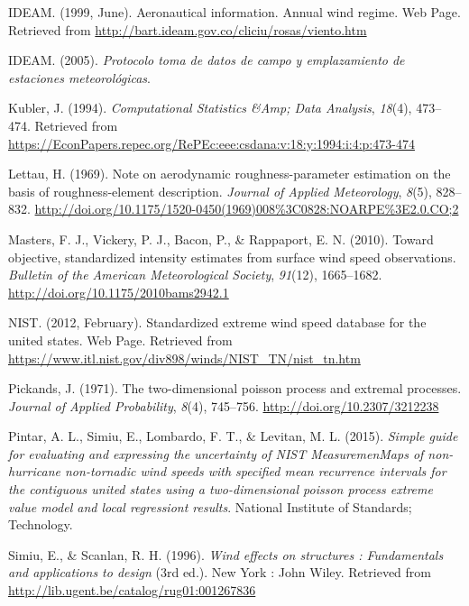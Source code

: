 \documentclass[12pt,oneside]{reedthesis}
\begin{document}
\leavevmode\hypertarget{ref-ideam1999}{}%
IDEAM. (1999, June). Aeronautical information. Annual wind regime. Web Page. Retrieved from \url{http://bart.ideam.gov.co/cliciu/rosas/viento.htm}

\leavevmode\hypertarget{ref-ideam2005}{}%
IDEAM. (2005). \emph{Protocolo toma de datos de campo y emplazamiento de estaciones meteorológicas}.

\leavevmode\hypertarget{ref-Kubler1994}{}%
Kubler, J. (1994). \emph{Computational Statistics \&Amp; Data Analysis}, \emph{18}(4), 473--474. Retrieved from \url{https://EconPapers.repec.org/RePEc:eee:csdana:v:18:y:1994:i:4:p:473-474}

\leavevmode\hypertarget{ref-Lettau1969}{}%
Lettau, H. (1969). Note on aerodynamic roughness-parameter estimation on the basis of roughness-element description. \emph{Journal of Applied Meteorology}, \emph{8}(5), 828--832. \url{http://doi.org/10.1175/1520-0450(1969)008\%3C0828:NOARPE\%3E2.0.CO;2}

\leavevmode\hypertarget{ref-Masters2010}{}%
Masters, F. J., Vickery, P. J., Bacon, P., \& Rappaport, E. N. (2010). Toward objective, standardized intensity estimates from surface wind speed observations. \emph{Bulletin of the American Meteorological Society}, \emph{91}(12), 1665--1682. \url{http://doi.org/10.1175/2010bams2942.1}

\leavevmode\hypertarget{ref-nist2012}{}%
NIST. (2012, February). Standardized extreme wind speed database for the united states. Web Page. Retrieved from \url{https://www.itl.nist.gov/div898/winds/NIST_TN/nist_tn.htm}

\leavevmode\hypertarget{ref-Pickands1971}{}%
Pickands, J. (1971). The two-dimensional poisson process and extremal processes. \emph{Journal of Applied Probability}, \emph{8}(4), 745--756. \url{http://doi.org/10.2307/3212238}

\leavevmode\hypertarget{ref-Pintar2015}{}%
Pintar, A. L., Simiu, E., Lombardo, F. T., \& Levitan, M. L. (2015). \emph{Simple guide for evaluating and expressing the uncertainty of NIST MeasuremenMaps of non-hurricane non-tornadic wind speeds with specified mean recurrence intervals for the contiguous united states using a two-dimensional poisson process extreme value model and local regressiont results}. National Institute of Standards; Technology.

\leavevmode\hypertarget{ref-Simiu1996}{}%
Simiu, E., \& Scanlan, R. H. (1996). \emph{Wind effects on structures : Fundamentals and applications to design} (3rd ed.). New York : John Wiley. Retrieved from \url{http://lib.ugent.be/catalog/rug01:001267836}
\end{document}

